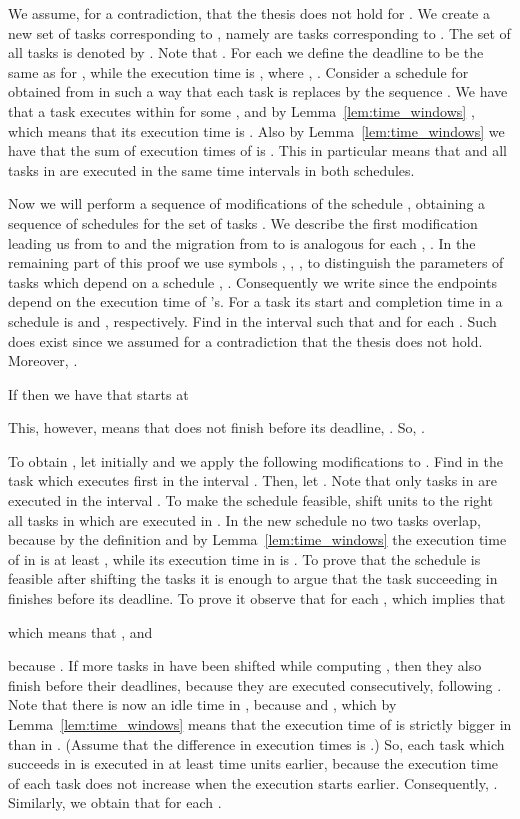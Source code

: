 \documentclass[10pt]{article}
\newenvironment{proof}[1][Proof]
{\par\noindent{\bf #1:} }{\hspace*{\fill}\nolinebreak{}\bigskip\par}
\begin{document}
\begin{proof}
We assume, for a contradiction, that the thesis does not hold for .
We create a new set of tasks corresponding to , namely  are  tasks corresponding to . The set of all tasks  is denoted by . Note that . For each  we define the deadline to be the same as for , while the execution time is , where , . Consider a schedule  for  obtained from  in such a way that each task  is replaces by the sequence . We have that a task  executes within  for some , and by Lemma~\ref{lem:time_windows} , which means that its execution time is . Also by Lemma~\ref{lem:time_windows} we have that the sum of execution times of  is . This in particular means that  and all tasks in  are executed in the same time intervals in both schedules.

Now we will perform a sequence of modifications of the schedule , obtaining a sequence of schedules  for the set of tasks . We describe the first modification leading us from  to  and the migration from  to  is analogous for each , . In the remaining part of this proof we use symbols , , ,  to distinguish the parameters of tasks which depend on a schedule , . Consequently we write  since the endpoints depend on the execution time of 's. For a task  its start and completion time in a schedule  is  and , respectively. Find in  the interval  such that  and  for each . Such  does exist since we assumed for a contradiction that the thesis does not hold. Moreover, .

If  then we have that  starts at

This, however, means that  does not finish before its deadline, . So, .

To obtain , let initially  and we apply the following modifications to . Find in  the task  which executes first in the interval . Then, let . Note that only tasks in  are executed in the interval . To make the schedule  feasible, shift  units to the right all tasks in  which are executed in . In the new schedule  no two tasks overlap, because by the definition and by Lemma~\ref{lem:time_windows} the execution time of  in  is at least , while its execution time in  is . To prove that the schedule is feasible after shifting the tasks it is enough to argue that the task  succeeding  in  finishes before its deadline. To prove it observe that for each ,  which implies that

which means that , and

because . If more tasks in  have been shifted while computing , then they also finish before their deadlines, because they are executed consecutively, following . Note that there is now an idle time in , because  and , which by Lemma~\ref{lem:time_windows} means that the execution time of  is strictly bigger in  than in . (Assume that the difference in execution times is .) So, each task which succeeds  in  is executed in  at least  time units earlier, because the execution time of each task does not increase when the execution starts earlier. Consequently, . Similarly, we obtain that  for each .


\end{proof}
\end{document}
